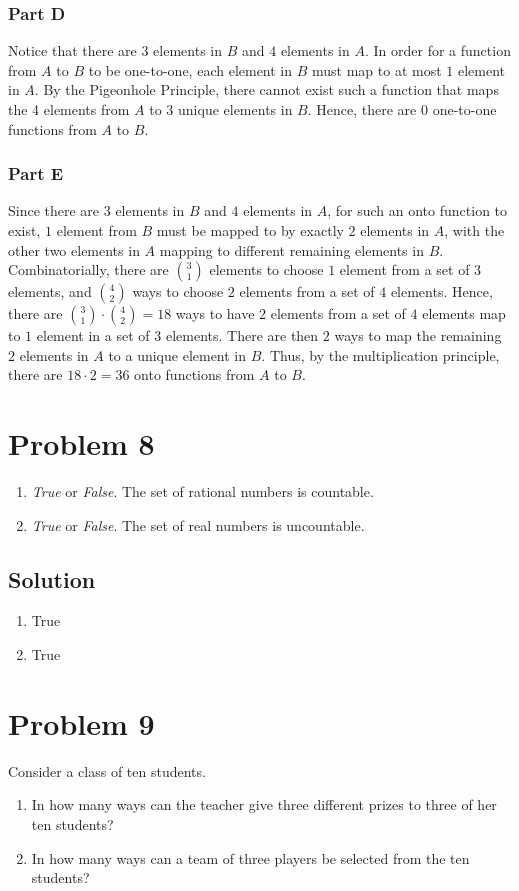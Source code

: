 \documentclass[table]{article}
\begin{document}
\subsubsection{Part D}
Notice that there are $3$ elements in $B$ and $4$ elements in $A$. In order for a function from $A$ to $B$ to be one-to-one, each element in $B$ must map to at most $1$ element in $A$. By the Pigeonhole Principle, there cannot exist such a function that maps the 4 elements from $A$ to 3 unique elements in $B$. Hence, there are $0$ one-to-one functions from $A$ to $B$.
\subsubsection{Part E}
Since there are $3$ elements in $B$ and $4$ elements in $A$, for such an onto function to exist, $1$ element from $B$ must be mapped to by exactly $2$ elements in $A$, with the other two elements in $A$ mapping to different remaining elements in $B$. Combinatorially, there are $3 \choose 1$ elements to choose $1$ element from a set of $3$ elements, and $4 \choose 2$ ways to choose $2$ elements from a set of $4$ elements. Hence, there are ${3 \choose 1} \cdot {4 \choose 2}=18$ ways to have $2$ elements from a set of $4$ elements map to $1$ element in a set of $3$ elements. There are then $2$ ways to map the remaining $2$ elements in $A$ to a unique element in $B$. Thus, by the multiplication principle, there are $18 \cdot 2 = 36$ onto functions from $A$ to $B$.
\section{Problem 8}
\begin{enumerate}[nosep,label=\alph*)]
\item \textit{True} or \textit{False}. The set of rational numbers is countable.
\item \textit{True} or \textit{False}. The set of real numbers is uncountable.
\end{enumerate}
\subsection{Solution}
\begin{enumerate}[nosep,label=\alph*)]
\item True
\item True
\end{enumerate}
\section{Problem 9}
Consider a class of ten students.
\begin{enumerate}[nosep,label=\alph*)]
\item In how many ways can the teacher give three different prizes to three of her ten students?
\item In how many ways can a team of three players be selected from the ten students?
\end{enumerate}
\end{document}
